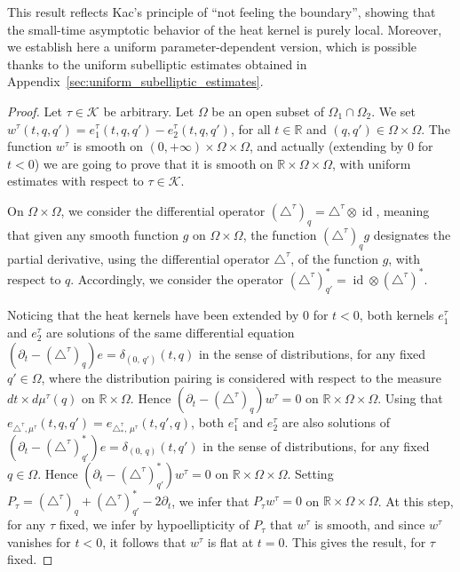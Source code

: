\documentclass[10pt]{amsart}
\theoremstyle{definition}\newtheorem{defi}[theo]{Definition}\newtheorem{rema}[theo]{Remark}\newtheorem{exam}[theo]{Example}\newtheorem{exem}[theo]{Example}\newtheorem{nota}[theo]{Notation}
\newcommand*\R{\mathbb{R}}
\newcommand{\calK}{\mathcal{K}}
\DeclareMathOperator{\id}{id}
\begin{document}
This result reflects Kac's principle of ``not feeling the boundary'', showing that the small-time asymptotic behavior of the heat kernel is purely local. Moreover, we establish here a uniform parameter-dependent version, which is possible thanks to the uniform subelliptic estimates obtained in Appendix~\ref{sec:uniform_subelliptic_estimates}.


\begin{proof}
Let $\tau\in\calK$ be arbitrary. Let $\Omega$ be an open subset of $\Omega_1\cap\Omega_2$. We set $w^\tau(t,q,q')=e^\tau_1(t,q,q')-e^\tau_2(t,q,q')$, for all $t\in\R$ and $(q,q')\in\Omega\times\Omega$. The function $w^\tau$ is smooth on $(0,+\infty)\times\Omega\times\Omega$, and actually (extending by $0$ for $t<0$) we are going to prove that it is smooth on $\R\times\Omega\times\Omega$, with uniform estimates with respect to $\tau\in\calK$.

On $\Omega\times\Omega$, we consider the differential operator $(\triangle^\tau)_q = \triangle^\tau\otimes\id$, meaning that given any smooth function $g$ on $\Omega\times\Omega$, the function $(\triangle^\tau)_q g$ designates the partial derivative, using the differential operator $\triangle^\tau$, of the function $g$, with respect to $q$. Accordingly, we consider the operator $(\triangle^\tau)_{q'}^* = \id\otimes (\triangle^\tau)^*$.

Noticing that the heat kernels have been extended by $0$ for $t<0$, both kernels $e^\tau_1$ and $e^\tau_2$ are solutions of the same differential equation $(\partial_t - (\triangle^\tau)_q)e = \delta_{(0,\,q')}(t,q)$ in the sense of distributions, for any fixed $q'\in\Omega$, where the distribution pairing is considered with respect to the measure $dt\times d\mu^\tau(q)$ on $\R\times\Omega$. Hence $(\partial_t-(\triangle^\tau)_q)w^\tau=0$ on $\R\times\Omega\times\Omega$. Using that $e_{\triangle^\tau,\mu^\tau}(t,q,q') = e_{\triangle^\tau_*,\,\mu^\tau}(t,q',q)$, both $e^\tau_1$ and $e^\tau_2$ are also solutions of $(\partial_t - (\triangle^\tau)_{q'}^*)e = \delta_{(0,\,q)}(t,q')$ in the sense of distributions, for any fixed $q\in\Omega$. Hence $(\partial_t-(\triangle^\tau)_{q'}^*)w^\tau=0$ on $\R\times\Omega\times\Omega$. Setting $P_\tau = (\triangle^\tau)_q + (\triangle^\tau)_{q'}^* - 2 \partial_t$, we infer that $P_\tau w^\tau=0$ on $\R\times\Omega\times\Omega$. At this step, for any $\tau$ fixed, we infer by hypoellipticity of $P_\tau$ that $w^\tau$ is smooth, and since $w^\tau$ vanishes for $t<0$, it follows that $w^\tau$ is flat at $t=0$. This gives the result, for $\tau$ fixed.


\end{proof}
\end{document}
